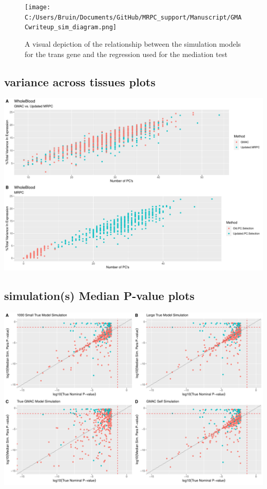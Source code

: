 \documentclass[
]{article}
\begin{document}
\begin{figure}
\centering
\texttt{[image: C:/Users/Bruin/Documents/GitHub/MRPC\_support/Manuscript/GMACwriteup\_sim\_diagram.png]}
\caption{A visual depiction of the relationship between the simulation
models for the trans gene and the regression used for the mediation
test}
\end{figure}

\hypertarget{variance-across-tissues-plots}{%
\subsection{variance across tissues
plots}\label{variance-across-tissues-plots}}

\includegraphics{12_15_2021_GMAC_plots_all_trios_files/figure-latex/unnamed-chunk-4-1.pdf}

\hypertarget{simulations-median-p-value-plots}{%
\subsection{simulation(s) Median P-value
plots}\label{simulations-median-p-value-plots}}

\includegraphics{12_15_2021_GMAC_plots_all_trios_files/figure-latex/unnamed-chunk-5-1.pdf}
\end{document}
